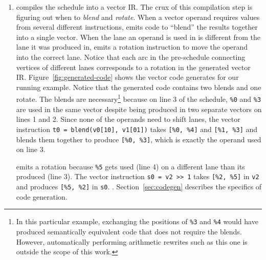 \begin{enumerate}
    \item \system compiles the schedule into a vector IR. The crux of this compilation step is figuring out when to {\em blend} and {\em rotate}. When a vector operand requires values from several different instructions, \system emits code to ``blend'' the results together into a single vector.
    When the lane an operand is used in is different from the lane it was produced in, \system emits a rotation instruction to move the operand into the correct lane. Notice that each arc in the pre-schedule connecting vertices of different lanes corresponds to a rotation in the generated vector IR.
    Figure~\ref{fig:generated-code} shows the vector code \system generates for our running example.
    Notice that the generated code contains two blends and one rotate.
    The blends are necessary\footnote{In this particular example, exchanging the positions of \texttt{\%3} and \texttt{\%4} would have produced semantically equivalent code that does not require the blends. However, automatically performing arithmetic rewrites such as this one is outside the scope of this work. } because on line 3 of the schedule, \texttt{\%0} and \texttt{\%3} are used in the same vector despite being produced in two separate vectors on lines 1 and 2. 
    Since none of the operands need to shift lanes, the vector instruction \texttt{t0 = blend(v0[10], v1[01])} takes \texttt{[\%0, \%4]} and \texttt{[\%1, \%3]} and blends them together to produce \texttt{[\%0, \%3]}, which is exactly the operand used on line 3. 

    \system emits a rotation because \texttt{\%5} gets used (line 4) on a different lane than its produced (line 3).
    The vector instruction \texttt{s0 = v2 >> 1} takes \texttt{[\%2, \%5]} in \texttt{v2} and produces \texttt{[\%5, \%2]} in \texttt{s0}.
    .
    Section~\ref{sec:codegen} describes the specifics of code generation.
\end{enumerate}

